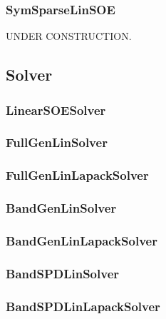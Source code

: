 \pagebreak
\subsubsection{SymSparseLinSOE}
UNDER CONSTRUCTION. \\

\pagebreak
\subsection{{\bf Solver}}


\pagebreak
\subsubsection{{\bf LinearSOESolver}}


\pagebreak
\subsubsection{{\bf FullGenLinSolver}}



\pagebreak
\subsubsection{FullGenLinLapackSolver}


\pagebreak
\subsubsection{{\bf BandGenLinSolver}}


\pagebreak
\subsubsection{BandGenLinLapackSolver}


\pagebreak
\subsubsection{{\bf BandSPDLinSolver}}


\pagebreak
\subsubsection{BandSPDLinLapackSolver}


